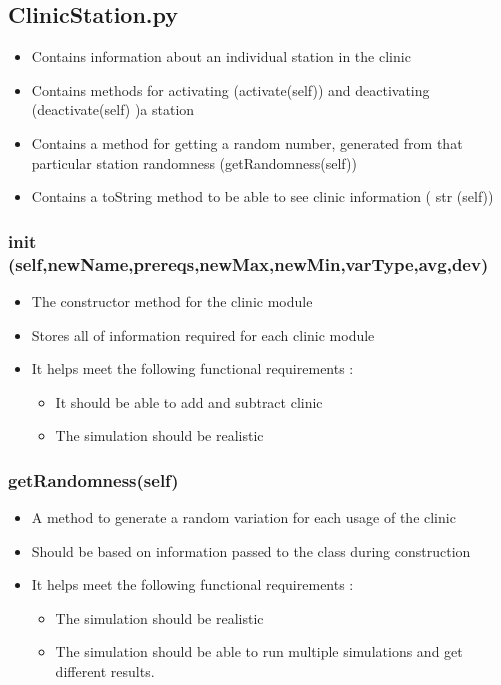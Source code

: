 \documentclass[12pt]{article}
\begin{document}
\subsection{ClinicStation.py}
\begin{itemize}  
\item Contains information about an individual station in the clinic
\item Contains methods for activating (activate(self)) and deactivating (deactivate(self) )a station
\item Contains a method for getting a random number, generated from that particular station randomness (getRandomness(self))
\item Contains a toString method to be able to see clinic information ( str (self))
\end{itemize}
\subsubsection{ init (self,newName,prereqs,newMax,newMin,varType,avg,dev)}
\begin{itemize}
	\item The constructor method for the clinic module
	\item Stores all of information required for each clinic module
	\item It helps meet the following functional requirements :
	\begin{itemize}
		\item It should be able to add and subtract clinic 
		\item The simulation should be realistic
	\end{itemize}
\end{itemize}
\subsubsection{getRandomness(self)}
\begin{itemize}
	\item A method to generate a random variation for each usage of the clinic
	\item Should be based on information passed to the class during construction
	\item It helps meet the following functional requirements :
	\begin{itemize}
		\item The simulation should be realistic
		\item The simulation should be able to run multiple simulations and get different results.
	\end{itemize}
\end{itemize}
\end{document}
